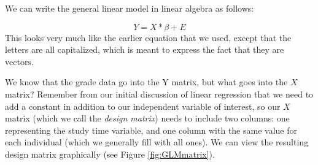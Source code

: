 \documentclass[12pt,]{book}
\newenvironment{Shaded}{\begin{snugshade}}{\end{snugshade}}
\newcommand{\DataTypeTok}[1]{\textcolor[rgb]{0.13,0.29,0.53}{#1}}
\newcommand{\DecValTok}[1]{\textcolor[rgb]{0.00,0.00,0.81}{#1}}
\newcommand{\KeywordTok}[1]{\textcolor[rgb]{0.13,0.29,0.53}{\textbf{#1}}}
\newcommand{\NormalTok}[1]{#1}
\newcommand{\OperatorTok}[1]{\textcolor[rgb]{0.81,0.36,0.00}{\textbf{#1}}}
\newcommand{\StringTok}[1]{\textcolor[rgb]{0.31,0.60,0.02}{#1}}
\theoremstyle{definition}
\theoremstyle{definition}
\theoremstyle{definition}
\theoremstyle{remark}
\begin{document}
\begin{Shaded}
\end{Shaded}

We can write the general linear model in linear algebra as follows:

\[
Y = X*\beta + E
\]
This looks very much like the earlier equation that we used, except that the letters are all capitalized, which is meant to express the fact that they are vectors.

We know that the grade data go into the Y matrix, but what goes into the \(X\) matrix? Remember from our initial discussion of linear regression that we need to add a constant in addition to our independent variable of interest, so our \(X\) matrix (which we call the \emph{design matrix}) needs to include two columns: one representing the study time variable, and one column with the same value for each individual (which we generally fill with all ones). We can view the resulting design matrix graphically (see Figure \ref{fig:GLMmatrix}).
\end{document}

